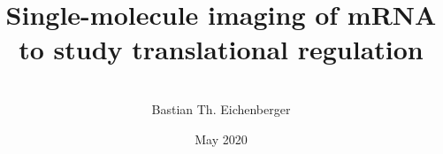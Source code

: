 \documentclass{masterthesis}
\title{Single-molecule imaging of mRNA to study translational regulation}
\author{\\Bastian Th. Eichenberger}
\date{May 2020}
\begin{document}
\maketitle
\makefrontmatter






\clearpage
\makebibliography

\begin{appendices}


\end{appendices}
\end{document}
